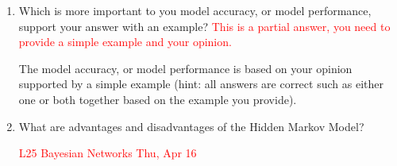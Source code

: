 \documentclass[12pt]{article}
\newenvironment{QandA}{\begin{enumerate}[label=\bfseries\arabic*.]\bfseries}
{\end{enumerate}}
\newenvironment{answered}{\par\normalfont\color{Sepia}}{}
\begin{document}
\begin{QandA}
    \item Which is more important to you \textemdash{} model accuracy, or model
    performance, support your answer with an example? \textcolor{red}{This is a
    partial answer, you need to provide a simple example and your
    opinion.}
    \begin{answered}
        The model accuracy, or model performance is based on your
        opinion supported by a simple example (hint: all answers are
        correct such as either one or both together based on the
        example you provide).
    \end{answered}

    \item What are advantages and disadvantages of the Hidden Markov Model?
    \begin{answered}
        \textcolor{red}{L25 Bayesian Networks \textemdash{} Thu, Apr 16}
    \end{answered}
\end{QandA}
\end{document}
